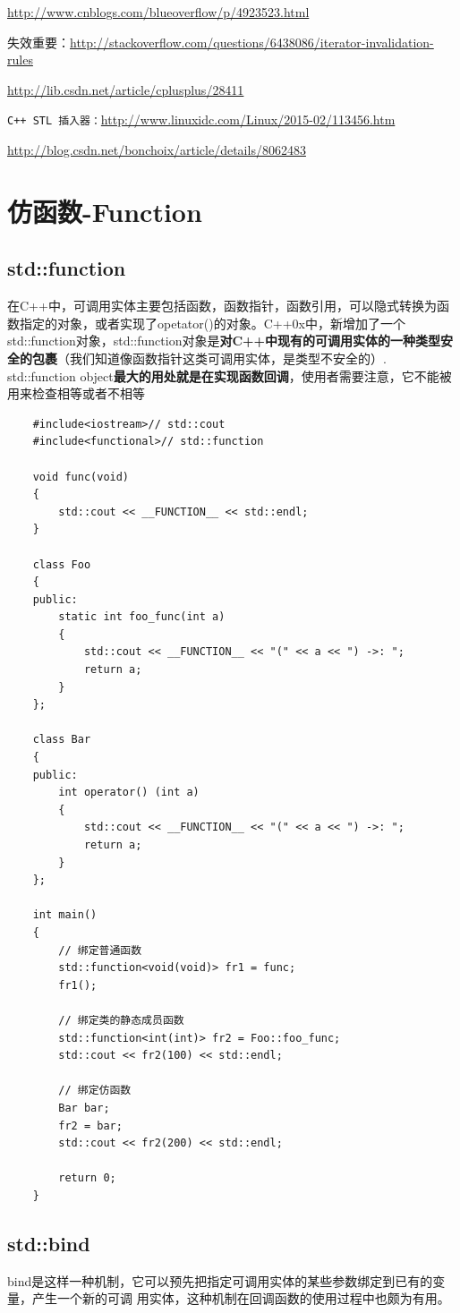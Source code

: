 \documentclass[UTF8,a4paper,12pt]{ctexbook}
\begin{document}
			\url{http://www.cnblogs.com/blueoverflow/p/4923523.html}
			
			失效重要：\url{http://stackoverflow.com/questions/6438086/iterator-invalidation-rules}
			
			\url{http://lib.csdn.net/article/cplusplus/28411}
			
			\verb|C++ STL 插入器：|\url{http://www.linuxidc.com/Linux/2015-02/113456.htm}
			
			\url{http://blog.csdn.net/bonchoix/article/details/8062483}
\chapter{仿函数-Function}
	\section{std::function}
		在C++中，可调用实体主要包括函数，函数指针，函数引用，可以隐式转换为函数指定的对象，或者实现了opetator()的对象。C++0x中，新增加了一个std::function对象，std::function对象是\textbf{对C++中现有的可调用实体的一种类型安全的包裹}（我们知道像函数指针这类可调用实体，是类型不安全的）.
		std::function object\textbf{最大的用处就是在实现函数回调}，使用者需要注意，它不能被用来检查相等或者不相等
		\begin{lstlisting}
	#include<iostream>// std::cout
	#include<functional>// std::function
	
	void func(void)
	{
		std::cout << __FUNCTION__ << std::endl;
	}
	
	class Foo
	{
	public:
		static int foo_func(int a)
		{
			std::cout << __FUNCTION__ << "(" << a << ") ->: ";
			return a;
		}
	};
	
	class Bar
	{
	public:
		int operator() (int a)
		{
			std::cout << __FUNCTION__ << "(" << a << ") ->: ";
			return a;
		}
	};
	
	int main()
	{
		// 绑定普通函数
		std::function<void(void)> fr1 = func;
		fr1();
		
		// 绑定类的静态成员函数
		std::function<int(int)> fr2 = Foo::foo_func;
		std::cout << fr2(100) << std::endl;
		
		// 绑定仿函数
		Bar bar;
		fr2 = bar;
		std::cout << fr2(200) << std::endl;
		
		return 0;
	}
		\end{lstlisting}
	\section{std::bind}
		bind是这样一种机制，它可以预先把指定可调用实体的某些参数绑定到已有的变量，产生一个新的可调 用实体，这种机制在回调函数的使用过程中也颇为有用。
	
\end{document}
